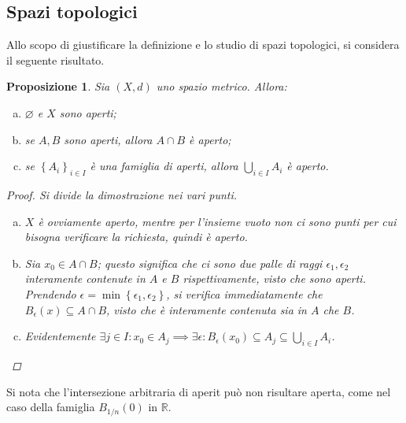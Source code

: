 \documentclass[12pt]{scrartcl}
\theoremstyle{style}
\newtheorem{prop}{Proposizione}[section]
\numberwithin{equation}{subsection}
\begin{document}
\subsection{Spazi topologici}
Allo scopo di giustificare la definizione e lo studio di spazi topologici, si considera il seguente risultato.
\begin{prop}
	Sia $(X,d)$ uno spazio metrico. Allora:
	\begin{enumerate}[(a).]
		\item $\varnothing$ e $X$ sono aperti;
		\item se $A,B$ sono aperti, allora $A\cap B$ \`e aperto;
		\item se $\left\{ A_i \right\} _{i\in I} $ \`e una famiglia di aperti, allora $\bigcup_{i \in I} A_i$ \`e aperto.
	\end{enumerate}
	\begin{proof}
		Si divide la dimostrazione nei vari punti.
		\begin{enumerate}[(a).]
			\item $X$ \`e ovviamente aperto, mentre per l'insieme vuoto non ci sono punti per cui bisogna verificare la richiesta, quindi \`e aperto.
			\item Sia $x_0 \in A\cap B$; questo significa che ci sono due palle di raggi $\epsilon _1, \epsilon _2$ interamente contenute in $A$ e $B$ rispettivamente, visto che sono aperti.
				Prendendo $\epsilon = \min \left\{ \epsilon _1,\epsilon _2 \right\} $, si verifica immediatamente che $B_\epsilon (x) \subseteq A\cap B$, visto che \`e interamente contenuta sia in $A$ che $B$.
			\item Evidentemente $\exists j \in I : x_0 \in A_j \implies \exists \epsilon : B_\epsilon (x_0) \subseteq A_j \subseteq \bigcup_{i \in I} A_i$.
		\end{enumerate}
	\end{proof}
\end{prop}
\noindent Si nota che l'intersezione arbitraria di aperit pu\`o non risultare aperta, come nel caso della famiglia $B_{1 / n} (0)$ in $\mathbb{R}$.
\end{document}
